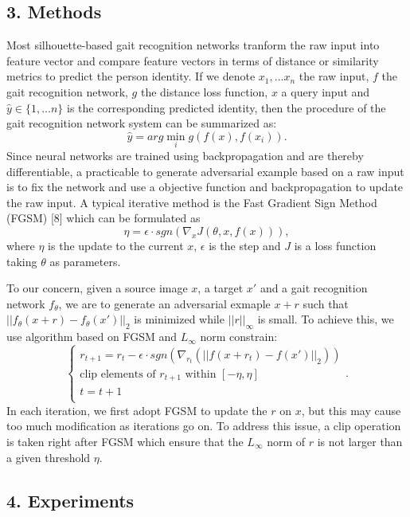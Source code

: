 \documentclass[letterpaper]{article} %
\begin{document}
\subsection{3. Methods}
Most silhouette-based gait recognition networks tranform the raw input into feature vector and compare feature vectors in terms of distance or similarity metrics to predict the person identity. If we denote $x_1,...x_n$ the raw input, $f$ the gait recognition network, $g$ the distance loss function, $x$ a query input and $\hat{y} \in \{1,...n\}$ is the corresponding predicted identity, then the procedure of the gait recognition network system can be summarized as:
$$\hat{y}=arg\min_{i}g(f(x),f(x_i)).$$
Since neural networks are trained using backpropagation and are thereby differentiable, a practicable to generate adversarial example based on a raw input is to fix the network and use a objective function and backpropagation to update the raw input. A typical iterative method is the Fast Gradient Sign Method (FGSM) [8] which can be formulated as 
$$\eta = \epsilon\cdot sgn(\nabla_{x}J(\theta,x,f(x))),$$
where $\eta$ is the update to the current $x$, $\epsilon$ is the step and $J$ is a loss function taking $\theta$ as parameters.

To our concern, given a source image $x$, a target $x'$ and a gait recognition network $f_{\theta}$, we are to generate an adversarial exmaple $x+r$ such that $||f_{\theta}(x+r)-f_{\theta}(x')||_2$ is minimized while $||r||_\infty$ is small. To achieve this, we use algorithm based on FGSM and $L_\infty$ norm constrain:
\begin{equation*}
\left\{
\begin{array}{lr}
r_{t+1}= r_t - \epsilon\cdot sgn(\nabla_{r_t}(||f(x+r_t)-f(x')||_2))\\
\text{clip } \text{elements of } r_{t+1} \text{ within } [-\eta,\eta]\\
t = t + 1\\ 
\end{array}
\right.
.
\end{equation*}
In each iteration, we first adopt FGSM to update the $r$ on $x$, but this may cause too much modification as iterations go on. To address this issue, a clip operation is taken right after FGSM which ensure that the $L_\infty$ norm of $r$ is not larger than a given threshold $\eta$.



\subsection{4. Experiments}
\end{document}
